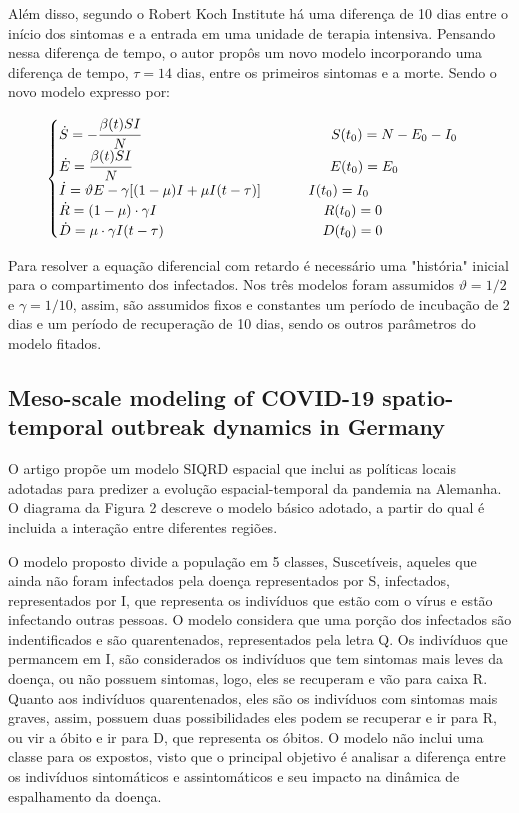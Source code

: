 \documentclass[12pt]{article}
\begin{document}
Além disso, segundo o Robert Koch Institute \cite{RKI} há uma diferença de 10 dias entre o início dos sintomas e a entrada em uma unidade de terapia intensiva. Pensando nessa diferença de tempo, o autor propôs um novo modelo incorporando uma diferença de tempo, $\tau = 14$ dias, entre os primeiros sintomas e a morte. Sendo o novo modelo expresso por:
\begin{center}
$$
\begin{cases}
\dot S = -\cfrac{\beta (t) S I}{N} \hspace{4.8cm} S(t_0)= N - E_0 - I_0\\
\dot E = \cfrac{\beta (t) S I}{N} \hspace{5.0cm} E(t_0) = E_0\\
\dot I = \vartheta E - \gamma [(1 - \mu)I + \mu I(t - \tau)] \hspace{1.2cm} I(t_0) = I_0\\
\dot R = (1- \mu) \cdot \gamma I\hspace{4.2cm} R(t_0) = 0 \\
\dot D = \mu \cdot \gamma I(t - \tau) \hspace{4.0cm}  D(t_0) = 0
\end{cases}
$$
\end{center}

Para resolver a equação diferencial com retardo é necessário uma "história" inicial para o compartimento dos infectados.
Nos três modelos foram assumidos $\vartheta = 1/2$ e $\gamma = 1/10$, assim, são assumidos fixos e constantes um período de incubação de 2 dias e um período de recuperação de 10 dias, sendo os outros parâmetros do modelo fitados.



\subsection{Meso-scale modeling of COVID-19 spatio-temporal outbreak dynamics in Germany}

O artigo \cite{kergassner2020meso} propõe um modelo SIQRD espacial que inclui as políticas locais adotadas para predizer a evolução espacial-temporal da pandemia na Alemanha. O diagrama da Figura 2 descreve o modelo básico adotado, a partir do qual é incluida a interação entre diferentes regiões. 

O modelo proposto divide a população em 5 classes, Suscetíveis, aqueles que ainda não foram infectados pela doença representados por S, infectados, representados por I, que representa os indivíduos que estão com o vírus e estão infectando outras pessoas. O modelo considera que uma porção dos infectados são indentificados e são quarentenados, representados pela letra Q. Os indivíduos que permancem em I, são considerados os indivíduos que tem sintomas mais leves da doença, ou não possuem sintomas, logo, eles se recuperam e vão para caixa R. Quanto aos indivíduos quarentenados, eles são os indivíduos com sintomas mais graves, assim, possuem duas possibilidades eles podem se recuperar e ir para R, ou vir a óbito e ir para D, que representa os óbitos. O modelo não inclui uma classe para os expostos, visto que o principal objetivo é analisar a diferença entre os indivíduos sintomáticos e assintomáticos e seu impacto na dinâmica de espalhamento da doença.
\end{document}
